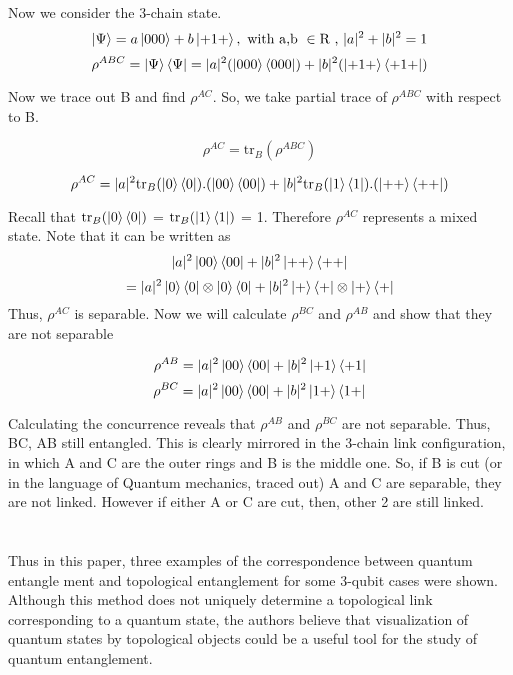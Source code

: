 \documentclass{scrartcl}
\begin{document}
\section{}

Now we consider the 3-chain state. 
\[
\ket{\Psi} = a\ket{000} + b\ket{+1+},  \text{ with a,b } \in \text{R , } |a|^2+|b|^2=1
\]
\[
\rho^{ABC}=\ket{\Psi}\bra{\Psi} = |a|^2 (\ket{000}\bra{000})+|b|^2(\ket{+1+}\bra{+1+})
\]

Now we trace out B and find $\rho^{AC} $. So, we take partial trace of $\rho^{ABC}$ with respect to B.

\[\rho^{AC} = \mathrm{tr}_B(\rho^{ABC})\]

\[
\rho^{AC} = |a|^2\mathrm{tr}_B(\ket{0}\bra{0}).(\ket{00}\bra{00}) + |b|^2\mathrm{tr}_B(\ket{1}\bra{1}).(\ket{++}\bra{++})
\]

Recall that $\mathrm{tr}_B(\ket{0}\bra{0})$ = $\mathrm{tr}_B(\ket{1}\bra{1})$ = 1. 
Therefore $\rho^{AC}$ represents a mixed state. Note that it can be written as
\[
|a|^2\ket{00}\bra{00}+|b|^2\ket{++}\bra{++}
\]
\[
=|a|^2\ket{0}\bra{0}\otimes\ket{0}\bra{0}+|b|^2\ket{+}\bra{+}\otimes\ket{+}\bra{+}
\]
Thus, $\rho^{AC}$ is separable. 
Now we will calculate $\rho^{BC}$ and $\rho^{AB}$ and show that they are not separable

\[
\rho^{AB}=|a|^2\ket{00}\bra{00}+|b|^2\ket{+1}\bra{+1}
\]
\[
\rho^{BC}=|a|^2\ket{00}\bra{00}+|b|^2\ket{1+}\bra{1+}
\]

Calculating the concurrence reveals that $\rho^{AB}$ and $\rho^{BC}$ are not separable. Thus, BC, AB still entangled. This is clearly mirrored in the 3-chain link configuration, in which A and C are the outer rings and B is the middle one. So, if B is cut (or in the language of Quantum mechanics, traced out) A and C are separable, they are not linked. However if either A or C are cut, then, other 2 are still linked.
\section{}

Thus in this paper,  three examples of the correspondence between quantum entangle
ment and topological entanglement for some 3-qubit cases were shown. Although this  method does not uniquely determine a topological link corresponding to a quantum state, the authors believe that visualization of quantum states by topological objects could be a useful tool for the study of quantum entanglement.
\end{document}
